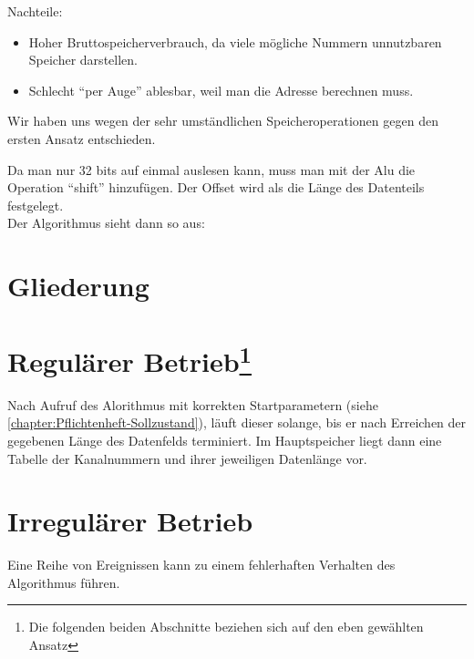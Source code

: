 Nachteile:
\begin{itemize}
    \item Hoher Bruttospeicherverbrauch, da viele mögliche Nummern unnutzbaren Speicher darstellen.
    \item Schlecht "`per Auge"' ablesbar, weil man die Adresse berechnen muss.
\end{itemize}

Wir haben uns wegen der sehr umständlichen Speicheroperationen gegen den ersten Ansatz entschieden.

Da man nur 32 bits auf einmal auslesen kann, muss man mit der Alu die Operation "`shift"' hinzufügen. Der Offset wird als die Länge des Datenteils festgelegt.\\
Der Algorithmus sieht dann so aus:



\section{Gliederung}
\label{section:Pflichtenheft-SystemtechnischeLoesung-Gliederung}



\section[Regulärer Betrieb]{Regulärer Betrieb\footnote{Die folgenden beiden Abschnitte beziehen sich auf den eben gewählten Ansatz}}
\label{section:Pflichtenheft-SystemtechnischeLoesung-regulaer}

Nach Aufruf des Alorithmus mit korrekten Startparametern (siehe \autoref{chapter:Pflichtenheft-Sollzustand}), läuft dieser solange, bis er nach Erreichen der gegebenen Länge des Datenfelds terminiert. Im Hauptspeicher liegt dann eine Tabelle der Kanalnummern und ihrer jeweiligen Datenlänge vor.


\section{Irregulärer Betrieb}
\label{section:Pflichtenheft-SystemtechnischeLoesung-irregulaer}

Eine Reihe von Ereignissen kann zu einem fehlerhaften Verhalten des Algorithmus führen.

